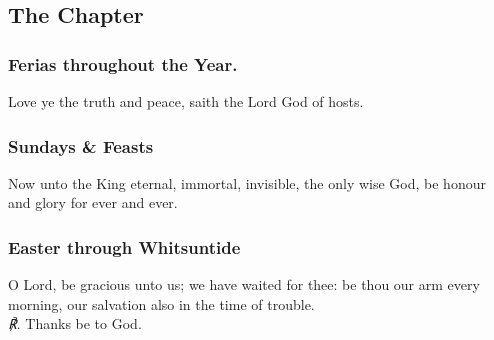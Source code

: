 \subsection{The Chapter}
\subsubsection{Ferias throughout the Year.}
Love ye the truth and peace, saith the Lord God of hosts. 
\subsubsection{Sundays \& Feasts}
Now unto the King eternal, immortal, invisible, the only wise God, be honour and glory for ever and ever. 
\subsubsection{Easter through Whitsuntide}
O Lord, be gracious unto us; we have waited for thee: be thou our arm every morning, our salvation also in the time of trouble. \\
\textit{\scshape ℟.} Thanks be to God.
